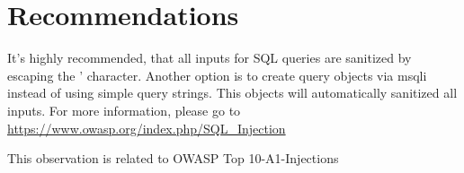 \section{Recommendations}
It's highly recommended, that all inputs for SQL queries are sanitized by escaping the ' character.
Another option is to create query objects via msqli instead of using simple query strings.
This objects will automatically sanitized all inputs. For more information, please go to \url{https://www.owasp.org/index.php/SQL\_Injection}

This observation is related to OWASP Top 10-A1-Injections

